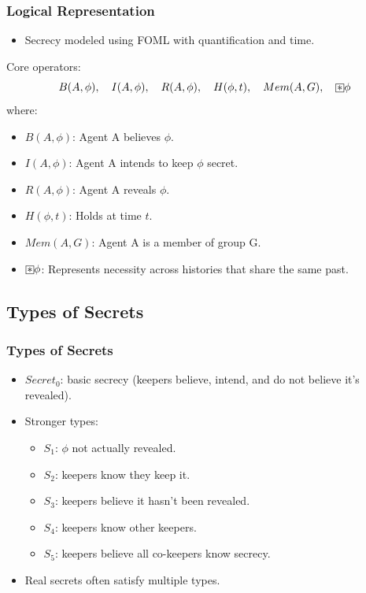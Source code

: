 \documentclass[aspectratio=169]{beamer}
\newcommand{\BoxStar}{\fboxsep=1pt\fbox{$\ast$}}
\begin{document}
\begin{frame}
\frametitle{Logical Representation}
\begin{itemize}
    \item Secrecy modeled using FOML with quantification and time.
\end{itemize}
\begin{block}{Core operators:}
\[ 
B(A, \phi), \quad I(A, \phi), \quad R(A, \phi), \quad H(\phi, t), \quad Mem(A, G), \quad \BoxStar \phi 
\]
\normalsize where:
\begin{itemize}
    \item $B(A, \phi)$: Agent A believes $\phi$.
    \item $I(A, \phi)$: Agent A intends to keep $\phi$ secret.
    \item $R(A, \phi)$: Agent A reveals $\phi$.
    \item $H(\phi, t)$: Holds at time $t$.
    \item $Mem(A, G)$: Agent A is a member of group G.
    \item $\BoxStar \phi$: Represents necessity across histories that share the same past.
\end{itemize}
\end{block}
\end{frame}

\subsection{Types of Secrets}
\begin{frame}
\frametitle{Types of Secrets}
\Large
\begin{itemize}
    \item $Secret_0$: basic secrecy (keepers believe, intend, and do not believe it's revealed).
    \item Stronger types:
    \begin{itemize}
        \Large
        \item $S_1$: $\phi$ not actually revealed.
        \item $S_2$: keepers know they keep it.
        \item $S_3$: keepers believe it hasn't been revealed.
        \item $S_4$: keepers know other keepers.
        \item $S_5$: keepers believe all co-keepers know secrecy.
    \end{itemize}
    \item Real secrets often satisfy multiple types.
\end{itemize}
\end{frame}
\end{document}
